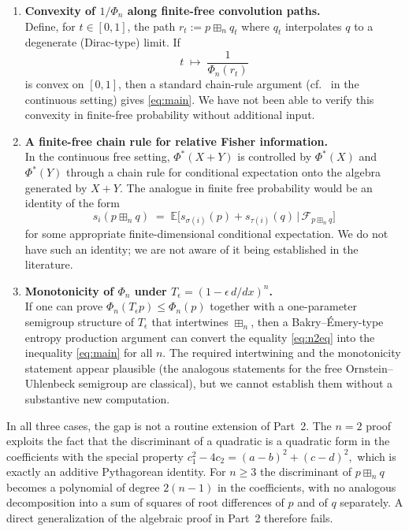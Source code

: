 \documentclass[12pt]{article}
\theoremstyle{definition}
\begin{document}
\begin{enumerate}
\item[(I)] \textbf{Convexity of $1/\Phi_n$ along finite-free convolution paths.}
\\Define, for $t\in[0,1]$, the path $r_t := p\boxplus_n q_t$ where $q_t$ interpolates $q$ to a degenerate (Dirac-type) limit. If
\[
t \;\mapsto\; \frac{1}{\Phi_n(r_t)}
\]
is convex on $[0,1]$, then a standard chain-rule argument (cf.~\cite[Prop.~7.7]{HiaiPetz} in the continuous setting) gives \eqref{eq:main}. We have not been able to verify this convexity in finite-free probability without additional input.

\item[(II)] \textbf{A finite-free chain rule for relative Fisher information.}
\\In the continuous free setting, $\Phi^*(X+Y)$ is controlled by $\Phi^*(X)$ and $\Phi^*(Y)$ through a chain rule for conditional expectation onto the algebra generated by $X+Y$. The analogue in finite free probability would be an identity of the form
\[
s_i(p\boxplus_n q) \;=\; \mathbb{E}\bigl[s_{\sigma(i)}(p) + s_{\tau(i)}(q)\,\big|\,\mathcal{F}_{p\boxplus_n q}\bigr]
\]
for some appropriate finite-dimensional conditional expectation. We do not have such an identity; we are not aware of it being established in the literature.

\item[(III)] \textbf{Monotonicity of $\Phi_n$ under $T_\epsilon=(1-\epsilon\,d/dx)^n$.}
\\If one can prove $\Phi_n(T_\epsilon p)\leq \Phi_n(p)$ together with a one-parameter semigroup structure of $T_\epsilon$ that intertwines $\boxplus_n$, then a Bakry--\'Emery-type entropy production argument can convert the equality \eqref{eq:n2eq} into the inequality \eqref{eq:main} for all $n$. The required intertwining and the monotonicity statement appear plausible (the analogous statements for the free Ornstein--Uhlenbeck semigroup are classical), but we cannot establish them without a substantive new computation.
\end{enumerate}

In all three cases, the gap is not a routine extension of Part~2. The $n=2$ proof exploits the fact that the discriminant of a quadratic is a quadratic form in the coefficients with the special property
$
c_1^2-4c_2=(a-b)^2+(c-d)^2,
$
which is exactly an additive Pythagorean identity. For $n\geq 3$ the discriminant of $p\boxplus_n q$ becomes a polynomial of degree $2(n-1)$ in the coefficients, with no analogous decomposition into a sum of squares of root differences of $p$ and of $q$ separately. A direct generalization of the algebraic proof in Part~2 therefore fails.
\end{document}
